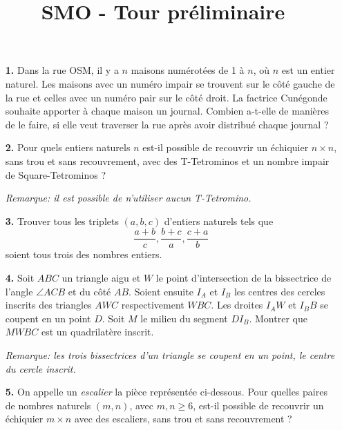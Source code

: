 \documentclass[language=french,style=exam]{smo}
\title{SMO - Tour préliminaire}
\begin{document}
\begin{enumerate}

\item[\textbf{1.}] 
Dans la rue OSM, il y a $n$ maisons numérotées de 1 à $n$, où $n$ est un entier naturel. Les maisons avec un numéro impair se trouvent sur le côté gauche de la rue et celles avec un numéro pair sur le côté droit. La factrice Cunégonde souhaite apporter à chaque maison un journal. Combien a-t-elle de manières de le faire, si elle veut traverser la rue après avoir distribué chaque journal ?

\bigskip

\item[\textbf{2.}] 
Pour quels entiers naturels $n$ est-il possible de recouvrir un échiquier $n\times n$, sans trou et sans recouvrement, avec des T-Tetrominos et un nombre impair de Square-Tetrominos ?
\vspace{0.2cm}
\begin{center}
\quad
{}
\end{center}
\vspace{0.2cm}
\textit{Remarque: il est possible de n'utiliser aucun T-Tetromino.}
\vspace{0.2cm}
\item[\textbf{3.}]
Trouver tous les triplets $(a,b,c)$ d'entiers naturels tels que
\[
\frac{a+b}{c},\frac{b+c}{a},\frac{c+a}{b}
\]
soient tous trois des nombres entiers.

\bigskip

\item[\textbf{4.}] 
Soit $ABC$ un triangle aigu et $W$ le point d'intersection de la bissectrice de l'angle $\angle ACB$ et du côté $AB$. Soient ensuite $I_A$ et $I_B$ les centres des cercles inscrits des triangles $AWC$ respectivement $WBC$. Les droites $I_AW$ et $I_BB$ se coupent en un point $D$. Soit $M$ le milieu du segment $DI_B$. Montrer que $MWBC$ est un quadrilatère inscrit.

\textit{Remarque: les trois bissectrices d'un triangle se coupent en un point, le centre du cercle inscrit.}

\bigskip

\item[\textbf{5.}] 
On appelle un \textit{escalier} la pièce représentée ci-dessous. Pour quelles paires de nombres naturels $(m,n)$, avec $m,n\geq 6$, est-il possible de recouvrir un échiquier $m\times n$ avec des escaliers, sans trou et sans recouvrement ?
\vspace{0.2cm}
\begin{center}


\end{center}
\end{enumerate}
\end{document}
